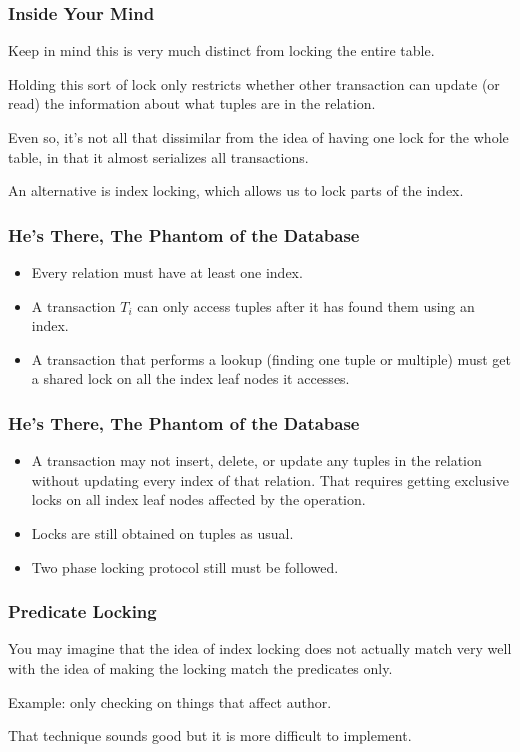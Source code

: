 \begin{frame}
\frametitle{Inside Your Mind}

Keep in mind this is very much distinct from locking the entire table. 

Holding this sort of lock only restricts whether other transaction can update (or read) the information about what tuples are in the relation. 

Even so, it's not all that dissimilar from the idea of having one lock for the whole table, in that it almost serializes all transactions.

An alternative is \alert{index locking}, which allows us to lock parts of the index.

\end{frame}



\begin{frame}
\frametitle{He's There, The Phantom of the Database}

\begin{itemize}
	\item Every relation must have at least one index.
	\item A transaction $T_{i}$ can only access tuples after it has found them using an index.
	\item A transaction that performs a lookup (finding one tuple or multiple) must get a shared lock on all the index leaf nodes it accesses.
\end{itemize}
	
	\end{frame}



\begin{frame}
\frametitle{He's There, The Phantom of the Database}

\begin{itemize}
	\item A transaction may not insert, delete, or update any tuples in the relation without updating every index of that relation. That requires getting exclusive locks on all index leaf nodes affected by the operation. 
	\item Locks are still obtained on tuples as usual.
	\item Two phase locking protocol still must be followed. 
\end{itemize}


\end{frame}

\begin{frame}
\frametitle{Predicate Locking}
You may imagine that the idea of index locking does not actually match very well with the idea of making the locking match the predicates only.

Example: only checking on things that affect author. 

That technique sounds good but it is more difficult to implement. 

\end{frame}

